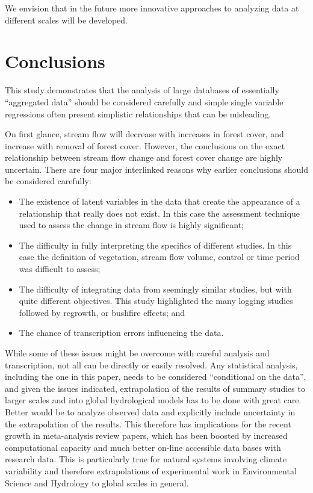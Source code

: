 \documentclass[]{elsarticle} %
\providecommand{\tightlist}{%
  \setlength{\itemsep}{0pt}\setlength{\parskip}{0pt}}
\begin{document}
We envision that in the future more innovative approaches to analyzing data at different scales will be developed.

\hypertarget{conclusions}{%
\section{Conclusions}\label{conclusions}}

This study demonstrates that the analysis of large databases of essentially ``aggregated data'' should be considered carefully and simple single variable regressions often present simplistic relationships that can be misleading.

On first glance, stream flow will decrease with increases in forest cover, and increase with removal of forest cover. However, the conclusions on the exact relationship between stream flow change and forest cover change are highly uncertain. There are four major interlinked reasons why earlier conclusions should be considered carefully:

\begin{itemize}
\tightlist
\item
  The existence of latent variables in the data that create the appearance of a relationship that really does not exist. In this case the assessment technique used to assess the change in stream flow is highly significant;\\
\item
  The difficulty in fully interpreting the specifics of different studies. In this case the definition of vegetation, stream flow volume, control or time period was difficult to assess;\\
\item
  The difficulty of integrating data from seemingly similar studies, but with quite different objectives. This study highlighted the many logging studies followed by regrowth, or bushfire effects; and\\
\item
  The chance of transcription errors influencing the data.
\end{itemize}

While some of these issues might be overcome with careful analysis and transcription, not all can be directly or easily resolved. Any statistical analysis, including the one in this paper, needs to be considered ``conditional on the data'', and given the issues indicated, extrapolation of the results of summary studies to larger scales and into global hydrological models has to be done with great care. Better would be to analyze observed data and explicitly include uncertainty in the extrapolation of the results. This therefore has implications for the recent growth in meta-analysis review papers, which has been boosted by increased computational capacity and much better on-line accessible data bases with research data. This is particularly true for natural systems involving climate variability and therefore extrapolations of experimental work in Environmental Science and Hydrology to global scales in general.
\end{document}
